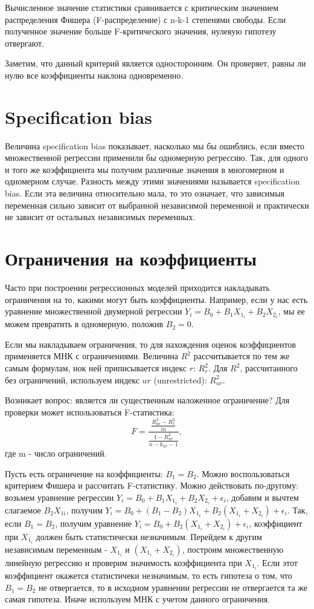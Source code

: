 Вычисленное значение статистики сравнивается с критическим значением распределения Фишера (F-распределение) с n-k-1 степенями свободы. Если полученное значение больше F-критического значения, нулевую гипотезу отвергают.

Заметим, что данный критерий является односторонним. Он проверяет, равны ли нулю все коэффициенты наклона одновременно.
\section{Specification bias}
\hspace*{\parindent}
Величина specification bias показывает, насколько мы бы ошиблись, если вместо множественной регрессии применили бы одномерную регрессию. Так, для одного и того же коэффициента мы получим различные значения в многомерном и одномерном случае. Разность между этими значениями называется  specification bias. Если эта величина относительно мала, то это означает, что зависимыя переменная сильно зависит от выбранной независимой переменной и практически не зависит от остальных независимых переменных.
\section{Ограничения на коэффициенты}
\hspace*{\parindent}
Часто при построении регрессионных моделей приходится накладывать ограничения на то, какими могут быть коэффициенты. Например, если у нас есть уравнение множественной двумерной регрессии $Y_i = B_0 + B_1X_1_i + B_2X_2_i$, мы ее можем превратить в одномерную, положив $B_2 = 0$.

Если мы накладываем ограничения, то для нахождения оценок коэффициентов применяется МНК с ограничениями. Величина $R^2$ рассчитывается по тем же самым формулам, нок ней приписывается индекс $r$: $R^2_r$. Для $R^2$, рассчитанного без ограничений, используем индекс $ur$ (unrestricted): $R^2_{ur}$.

Возникает вопрос: является ли существенным наложенное ограничение? Для проверки может использоваться F-статистика:
$$F = \frac{\frac{R^2_{ur} - R^2_{r}}{m}}{\frac{1 - R^2_{ur}}{n - k_{ur} - 1}},$$ где m - число ограничений.

Пусть есть ограничение на коэффициенты: $B_1 = B_2$. Можно воспользоваться критерием Фишера и рассчитать F-статистику. Можно действовать по-другому: возьмем уравнение регрессии $Y_i = B_0 + B_1X_1_i +B_2X_2_i + \epsilon_i$, добавим и вычтем слагаемое $B_2X_{1i}$, получим $Y_i = B_0 + (B_1 - B_2)X_1_i + B_2(X_1_i + X_2_i) + \epsilon_i$. Так, если $B_1 = B_2$, получим уравнение $Y_i = B_0 + B_2(X_1_i + X_2_i) + \epsilon_i$, коэффициент при $X_1_i$ должен быть статистически незначимым. Перейдем к другим независимым переменным - $X_1_i$ и $(X_1_i + X_2_i)$, построим множественную линейную регрессию и проверим значимость коэффициента при $X_1_i$. Если этот коэффициент окажется статистичеки незначимым, то есть гипотеза о том, что $B_1 = B_2$ не отвергается, то в исходном уравнении регрессии не отвергается та же самая гипотеза. Иначе используем МНК с учетом данного ограничения.

